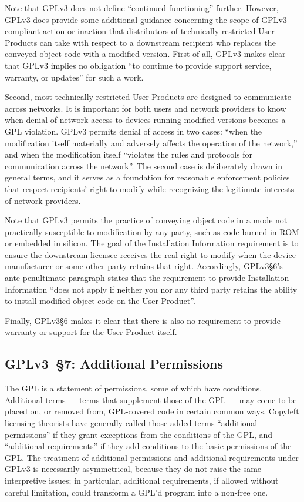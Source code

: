 Note that GPLv3 does not define ``continued functioning'' further.  However,
GPLv3 does provide some additional guidance concerning the scope of
GPLv3-compliant action or inaction that distributors of
technically-restricted User Products can take with respect to a downstream
recipient who replaces the conveyed object code with a modified version.
First of all, GPLv3 makes clear that GPLv3 implies no obligation ``to
continue to provide support service, warranty, or updates'' for such a work.

Second, most technically-restricted User Products are designed to communicate
across networks.  It is important for both users and network providers to
know when denial of network access to devices running modified versions
becomes a GPL violation.  GPLv3 permits denial of access in two cases: ``when
the modification itself materially and adversely affects the operation of the
network,'' and when the modification itself ``violates the rules and
protocols for communication across the network''.  The second case is
deliberately drawn in general terms, and it serves as a foundation for
reasonable enforcement policies that respect recipients' right to modify
while recognizing the legitimate interests of network providers.

Note that GPLv3 permits the practice of conveying object code in a mode not
practically susceptible to modification by any party, such as code burned in
ROM or embedded in silicon.  The goal of the Installation Information
requirement is to ensure the downstream licensee receives the real right to
modify when the device manufacturer or some other party retains that right.
Accordingly, GPLv3\S6's ante-penultimate paragraph states that the
requirement to provide Installation Information ``does not apply if neither
you nor any third party retains the ability to install modified object code
on the User Product''.

Finally, GPLv3\S6 makes it clear that there is also no requirement to
provide warranty or support for the User Product itself.

\subsection{GPLv3~\S7: Additional Permissions}
\label{GPLv3s7}

The GPL is a statement of permissions, some of which have conditions.
Additional terms --- terms that supplement those of the GPL --- may come to be
placed on, or removed from, GPL-covered code in certain common ways.
Copyleft licensing theorists have generally called
 those added terms ``additional permissions'' if they grant
exceptions from the conditions of the GPL, and ``additional requirements'' if
they add conditions to the basic permissions of the GPL\@. The treatment of
additional permissions and additional requirements under GPLv3 is necessarily
asymmetrical, because they do not raise the same interpretive
issues; in particular, additional requirements, if allowed without careful
limitation, could transform a GPL'd program into a non-free one.

